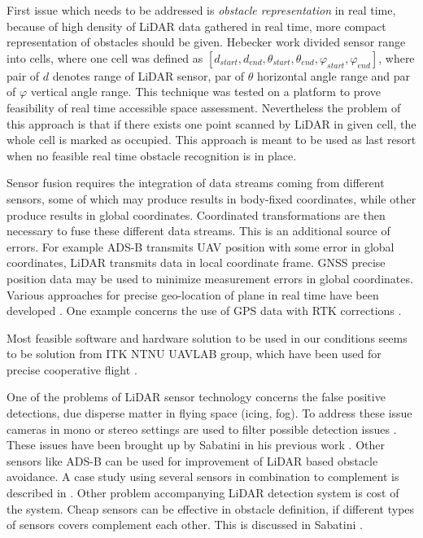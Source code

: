 First issue which needs to be addressed is \textit{obstacle representation} in real time, because of high density of LiDAR data gathered in real time, more compact representation of obstacles should be given. Hebecker work \cite{hebecker2015model} divided sensor range into cells, where one cell was defined as $[d_{start}, d_{end}, \theta_{start}, \theta_{end}, \varphi_{start}, \varphi_{end}]$, where pair of $d$ denotes range of LiDAR sensor, par of $\theta$ horizontal angle range and par of $\varphi$ vertical angle range. This technique was tested on a platform \cite{adolf2009unmanned} to prove feasibility of real time accessible space assessment. Nevertheless the problem of this approach is that if there exists one point scanned by LiDAR in given cell, the whole cell is marked as occupied. This approach is meant to be used as last resort when no feasible real time obstacle recognition is in place.

Sensor fusion requires the integration of data streams coming from different sensors, some of which may produce results in body-fixed coordinates, while other produce results in global coordinates. Coordinated transformations are then necessary to fuse these different data streams. This is an additional source of errors. For example ADS-B  transmits UAV position with some error in global coordinates, LiDAR transmits data in local coordinate frame. GNSS precise position data may be used to minimize measurement errors in global coordinates. Various approaches for precise geo-location of plane in real time have been developed \cite{sabatini2013novel,sabatini2013new1}.  One example concerns the use of GPS data with RTK corrections \cite{sabatini2013new2}.


Most feasible software and hardware solution to be used in our conditions seems to be solution from ITK NTNU UAVLAB group, which have been used for precise cooperative flight \cite{skulstad2015net,skulstad2015autonomous}.


One of the problems of LiDAR sensor technology concerns the false positive detections, due disperse matter in flying space (icing, fog). To address these issue cameras in mono or stereo settings are used to filter possible detection issues \cite{lai2012see}. These issues have been brought up by Sabatini in his previous work \cite{sabatini2010airborne}. Other sensors like ADS-B can be used for improvement of LiDAR based obstacle avoidance. A case study using several sensors in combination to complement is described in \cite{cornic2011sense}. 
Other problem accompanying LiDAR detection system is cost of the system. Cheap sensors can be effective in obstacle definition, if different types of sensors covers complement each other. This is discussed in Sabatini \cite{sabatini2013low}.

